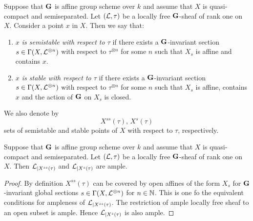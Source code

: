 \begin{definition}
Suppose that $\mathbf{G}$ is affine group scheme over $k$ and assume that $X$ is quasi-compact and semiseparated. Let $({\mathcal L},\tau)$ be a locally free $\mathbf{G}$-sheaf of rank one on $X$. Consider a point $x$ in $X$. Then we say that:
\begin{enumerate}[label=\textbf{(\arabic*)}, leftmargin=3.0em]
\item \textit{$x$ is semistable with respect to $\tau$} if there exists a $\mathbf{G}$-invariant section $s\in \Gamma(X,{\mathcal L}^{\otimes n})$ with respect to $\tau^{\otimes n}$ for some $n$ such that $X_s$ is affine and contains $x$.
\item \textit{$x$ is stable with respect to $\tau$} if there exists a $\mathbf{G}$-invariant section $s\in \Gamma(X,{\mathcal L}^{\otimes n})$ with respect to $\tau^{\otimes n}$ for some $n$ such that $X_s$ is affine, contains $x$ and the action of $\mathbf{G}$ on $X_s$ is closed.
\end{enumerate}
We also denote by
$$X^{ss}\left(\tau\right),\,X^s\left(\tau\right)$$
sets of semistable and stable points of $X$ with respect to $\tau$, respectively.
\end{definition}

\begin{fact}\label{fact:line_bundle_is_ample_on_sets_of_semistable_and_stable_points}
Suppose that $\mathbf{G}$ is affine group scheme over $k$ and assume that $X$ is quasi-compact and semiseparated. Let $({\mathcal L},\tau)$ be a locally free $\mathbf{G}$-sheaf of rank one on $X$. Then ${\mathcal L}_{\mid X^{ss}(\tau)}$ and ${\mathcal L}_{\mid X^s(\tau)}$ are ample.
\end{fact}
\begin{proof}
By definition $X^{ss}(\tau)$ can be covered by open affines of the form $X_s$ for $\mathbf{G}$-invariant global sections $s\in \Gamma(X, {\mathcal L}^{\otimes n})$ for $n\in {\mathbb N}$. This is one fo the equivalent conditions for ampleness of ${\mathcal L}_{\mid X^{ss}(\tau)}$. The restriction of ample locally free sheaf to an open subset is ample. Hence ${\mathcal L}_{\mid X^s(\tau)}$ is also ample.    
\end{proof}

